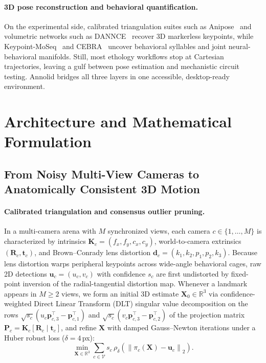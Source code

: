\documentclass[10pt,twocolumn,letterpaper]{article}
\begin{document}
\paragraph{3D pose reconstruction and behavioral quantification.}
On the experimental side, calibrated triangulation suites such as Anipose~\cite{karashchuk2021anipose} and volumetric networks such as DANNCE~\cite{dunn2021dannce} recover 3D markerless keypoints, while Keypoint-MoSeq~\cite{weinreb2024keypointmoseq} and CEBRA~\cite{schneider2023cebra} uncover behavioral syllables and joint neural-behavioral manifolds. Still, most ethology workflows stop at Cartesian trajectories, leaving a gulf between pose estimation and mechanistic circuit testing. Annolid bridges all three layers in one accessible, desktop-ready environment.

\section{Architecture and Mathematical Formulation}

\subsection{From Noisy Multi-View Cameras to Anatomically Consistent 3D Motion}

\paragraph{Calibrated triangulation and consensus outlier pruning.}
In a multi-camera arena with $M$ synchronized views, each camera $c \in \{1,\dots,M\}$ is characterized by intrinsics $\mathbf{K}_c = (f_x, f_y, c_x, c_y)$, world-to-camera extrinsics $(\mathbf{R}_c, \mathbf{t}_c)$, and Brown--Conrady lens distortion $\mathbf{d}_c = (k_1, k_2, p_1, p_2, k_3)$. Because lens distortion warps peripheral keypoints across wide-angle behavioral cages, raw 2D detections $\mathbf{u}_c = (u_c, v_c)$ with confidence $s_c$ are first undistorted by fixed-point inversion of the radial-tangential distortion map. Whenever a landmark appears in $M \ge 2$ views, we form an initial 3D estimate $\mathbf{X}_0 \in \mathbb{R}^3$ via confidence-weighted Direct Linear Transform (DLT) singular value decomposition on the rows $\sqrt{s_c}(u_c \mathbf{p}_{c,3}^\top - \mathbf{p}_{c,1}^\top)$ and $\sqrt{s_c}(v_c \mathbf{p}_{c,3}^\top - \mathbf{p}_{c,2}^\top)$ of the projection matrix $\mathbf{P}_c = \mathbf{K}_c[\mathbf{R}_c \mid \mathbf{t}_c]$, and refine $\mathbf{X}$ with damped Gauss--Newton iterations under a Huber robust loss ($\delta = 4$\,px):
\begin{equation}
  \min_{\mathbf{X}\in\mathbb{R}^3} \sum_{c \in \mathcal{V}} s_c \, \rho_\delta\!\left(\left\|\pi_c(\mathbf{X}) - \mathbf{u}_c\right\|_2\right).
\end{equation}
\end{document}
